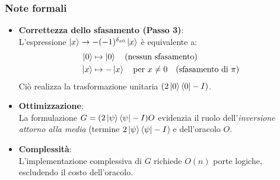 \documentclass[a4paper,12pt]{report}
\theoremstyle{plain}
\begin{document}
\subsubsection{Note formali}
\begin{itemize}
    \item \textbf{Correttezza dello sfasamento (Passo 3)}: \\
    L'espressione $\ket{x} \to -(-1)^{\delta_{x0}} \ket{x}$ è equivalente a:
    \begin{align*}
        \ket{0} &\mapsto \ket{0} \quad \text{(nessun sfasamento)} \\
        \ket{x} &\mapsto -\ket{x} \quad \text{per } x \neq 0 \quad \text{(sfasamento di $\pi$)}
    \end{align*}
    Ciò realizza la trasformazione unitaria $(2\ket{0}\bra{0} - I)$.
    
    \item \textbf{Ottimizzazione}: \\
    La formulazione $G = (2\ket{\psi}\bra{\psi} - I)O$ evidenzia il ruolo dell'\emph{inversione attorno alla media} (termine $2\ket{\psi}\bra{\psi} - I$) e dell'oracolo $O$.
    
    \item \textbf{Complessità}: \\
    L'implementazione complessiva di $G$ richiede $O(n)$ porte logiche, escludendo il costo dell'oracolo.
\end{itemize}
\end{document}
